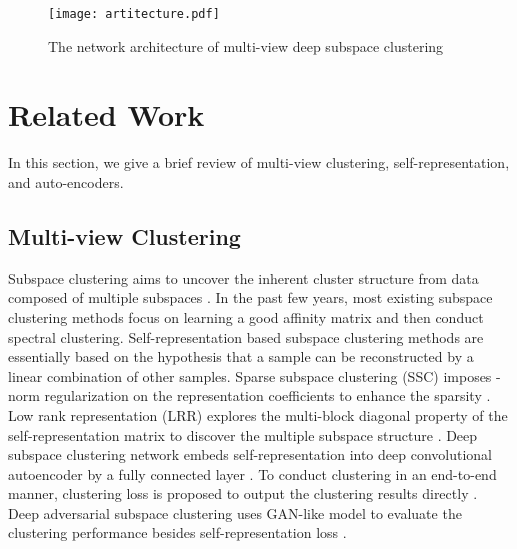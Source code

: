 \documentclass[journal]{IEEEtran}
\begin{document}
\begin{figure*}[!htbp]
	\centering
	\texttt{[image: artitecture.pdf]}
	\caption{The network architecture of multi-view deep subspace clustering}
	\label{architecture}
\end{figure*}

\section{Related Work}
\label{s2}
In this section, we give a brief review of multi-view clustering, self-representation, and auto-encoders.
\subsection{Multi-view Clustering}
Subspace clustering aims to uncover the inherent cluster structure from data composed of multiple subspaces \cite{Zhou2018DeepAS}.
In the past few years, most existing subspace clustering methods focus on learning a good affinity matrix and then conduct spectral clustering.
Self-representation based subspace clustering methods are essentially based on the hypothesis that a sample can be reconstructed by a linear combination of other samples.
Sparse subspace clustering (SSC) imposes -norm regularization on the representation coefficients to enhance the sparsity \cite{Elhamifar2009Sparse}.
Low rank representation (LRR) explores the multi-block diagonal property of the self-representation matrix to discover the multiple subspace structure \cite{Guangcan2013Robust,Lu2018Subspace}.
Deep subspace clustering network embeds self-representation into deep convolutional autoencoder by a fully connected layer \cite{ji2017deep}.
To conduct clustering in an end-to-end manner, clustering loss is proposed to output the clustering results directly \cite{Peng2018StructuredAF}.
Deep adversarial subspace clustering uses GAN-like model to evaluate the clustering performance besides self-representation loss \cite{Zhou2018DeepAS}.
\end{document}
